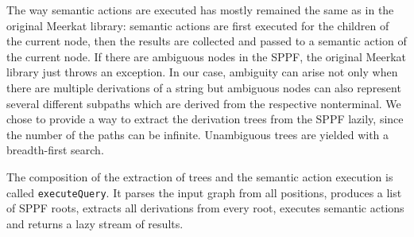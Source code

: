 


The way semantic actions are executed has mostly remained the same as in the original Meerkat library: semantic actions are first executed for the children of the current node, then the results are collected and passed to a semantic action of the current node. 
If there are ambiguous nodes in the SPPF, the original Meerkat library just throws an exception. 
In our case, ambiguity can arise not only when there are multiple derivations of a string but ambiguous nodes can also represent several different subpaths which are derived from the respective nonterminal.
We chose to provide a way to extract the derivation trees from the SPPF lazily, since the number of the paths can be infinite. 
Unambiguous trees are yielded with a breadth-first search.




The composition of the extraction of trees and the semantic action execution is called \lstinline{executeQuery}.
It parses the input graph from all positions, produces a list of SPPF roots, extracts all derivations from every root, executes semantic actions and returns a lazy stream of results.